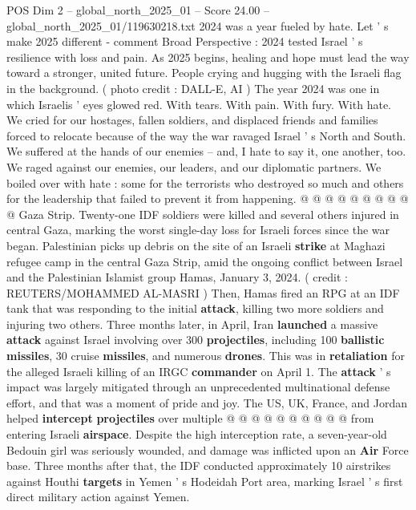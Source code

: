 \begin{textsample}{POS Dim 2 – global\_north\_2025\_01 – Score 24.00 – global\_north\_2025\_01/119630218.txt}  \label{ex:f2_pos_393}
2024 was a year fueled by hate.
Let ' s make 2025 different - comment Broad Perspective : 2024 tested Israel ' s resilience with loss and pain.
As 2025 begins, healing and hope must lead the way toward a stronger, united future.
People crying and hugging with the Israeli flag in the background. ( photo credit : DALL-E, AI ) The year 2024 was one in which Israelis ' eyes glowed red.
With tears.
With pain.
With fury.
With hate.
We cried for our hostages, fallen soldiers, and displaced friends and families forced to relocate because of the way the war ravaged Israel ' s North and South.
We suffered at the hands of our enemies -- and, I hate to say it, one another, too.
We raged against our enemies, our leaders, and our diplomatic partners.
We boiled over with hate : some for the terrorists who destroyed so much and others for the leadership that failed to prevent it from happening. @ @ @ @ @ @ @ @ @ @ Gaza Strip.
Twenty-one IDF soldiers were killed and several others injured in central Gaza, marking the worst single-day loss for Israeli forces since the war began.
Palestinian picks up debris on the site of an Israeli \textbf{strike} at Maghazi refugee camp in the central Gaza Strip, amid the ongoing conflict between Israel and the Palestinian Islamist group Hamas, January 3, 2024. ( credit : REUTERS/MOHAMMED AL-MASRI ) Then, Hamas fired an RPG at an IDF tank that was responding to the initial \textbf{attack}, killing two more soldiers and injuring two others.
Three months later, in April, Iran \textbf{launched} a massive \textbf{attack} against Israel involving over 300 \textbf{projectiles}, including 100 \textbf{ballistic} \textbf{missiles}, 30 cruise \textbf{missiles}, and numerous \textbf{drones}.
This was in \textbf{retaliation} for the alleged Israeli killing of an IRGC \textbf{commander} on April 1.
The \textbf{attack} ' s impact was largely mitigated through an unprecedented multinational defense effort, and that was a moment of pride and joy.
The US, UK, France, and Jordan helped \textbf{intercept} \textbf{projectiles} over multiple @ @ @ @ @ @ @ @ @ @ from entering Israeli \textbf{airspace}.
Despite the high interception rate, a seven-year-old Bedouin girl was seriously wounded, and damage was inflicted upon an \textbf{Air} Force base.
Three months after that, the IDF conducted approximately 10 airstrikes against Houthi \textbf{targets} in Yemen ' s Hodeidah Port area, marking Israel ' s first direct military action against Yemen.

\end{textsample}

